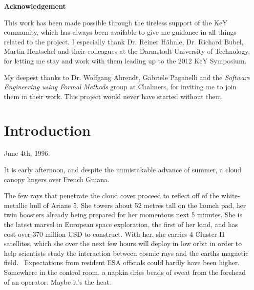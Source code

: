\documentclass{article}
\newcommand{\tmem}[1]{{\em #1\/}}
\newcommand{\tmstrong}[1]{\textbf{#1}}
\newenvironment{tmparmod}[3]{\begin{list}{}{\setlength{\topsep}{0pt}\setlength{\leftmargin}{#1}\setlength{\rightmargin}{#2}\setlength{\parindent}{#3}\setlength{\listparindent}{\parindent}\setlength{\itemindent}{\parindent}\setlength{\parsep}{\parskip}} \item[]}{\end{list}}
\begin{document}
\begin{flushleft}
  \begin{tmparmod}{10cm}{0pt}{0pt}
    \begin{tmparmod}{5cm}{0pt}{0pt}
      \begin{tmparmod}{2cm}{0pt}{0pt}
        \begin{tmparmod}{0pt}{2cm}{0pt}
          {\tmstrong{Acknowledgement}}
          
          
          
          This work has been made possible through the tireless support of the
          KeY community, which has always been available to give me guidance
          in all things related to the project. I especially thank Dr. Reiner
          H{\"a}hnle, Dr. Richard Bubel, Martin Hentschel and their colleagues
          at the Darmstadt University of Technology, for letting me stay and
          work with them leading up to the 2012 KeY Symposium.
          
          
          
          My deepest thanks to Dr. Wolfgang Ahrendt, Gabriele Paganelli and
          the {\tmem{Software Engineering using Formal Methods}} group at
          Chalmers, for inviting me to join them in their work. This project
          would never have started without them.
        \end{tmparmod}
      \end{tmparmod}
    \end{tmparmod}
  \end{tmparmod}
\end{flushleft}





{\pagebreak}

{\tableofcontents}



\section{Introduction}

June 4th, 1996.



It is early afternoon, and despite the unmistakable advance of summer, a
cloud canopy lingers over French Guiana.



The few rays that penetrate the cloud cover proceed to reflect off of the
white-metallic hull of Ariane 5. She towers about 52 metres tall on the launch
pad, her twin boosters already being prepared for her momentous next 5
minutes. She is the latest marvel in European space exploration, the first of
her kind, and has cost over 370 million USD to construct. With her, she
carries 4 Cluster II satellites, which she over the next few hours will deploy
in low orbit in order to help scientists study the interaction between cosmic
rays and the earths magnetic field. \ Expectations from resident ESA officials
could hardly have been higher. Somewhere in the control room, a napkin dries
beads of sweat from the forehead of an operator. Maybe it's the heat.
\end{document}
